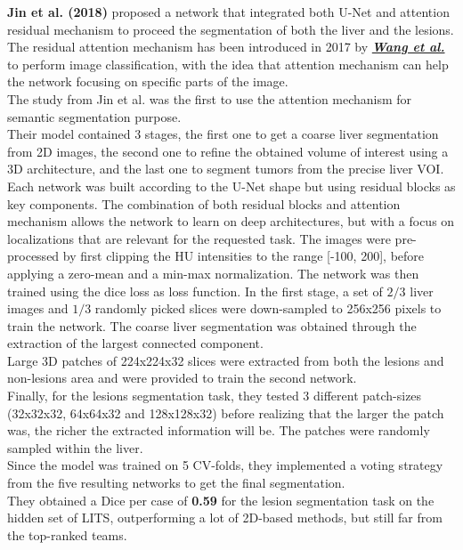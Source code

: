 \textbf{Jin et al. (2018)} proposed a network that integrated both U-Net
and attention residual mechanism to proceed the segmentation of both the
liver and the lesions.\\
The residual attention mechanism has been introduced in 2017 by
\href{https://arxiv.org/pdf/1704.06904.pdf}{\textbf{\emph{Wang et al.}}}
to perform image classification, with the idea that attention mechanism
can help the network focusing on specific parts of the image.\\
The study from Jin et al. was the first to use the attention mechanism
for semantic segmentation purpose.\\
Their model contained 3 stages, the first one to get a coarse liver
segmentation from 2D images, the second one to refine the obtained
volume of interest using a 3D architecture, and the last one to segment
tumors from the precise liver VOI.\\
Each network was built according to the U-Net shape but using residual
blocks as key components. The combination of both residual blocks and
attention mechanism allows the network to learn on deep architectures,
but with a focus on localizations that are relevant for the requested
task.
The images were pre-processed by first clipping the HU intensities to
the range {[}-100, 200{]}, before applying a zero-mean and a min-max
normalization. The network was then trained using the dice loss as loss
function.
In the first stage, a set of $2/3$ liver images and $1/3$ randomly picked slices
were down-sampled to 256x256 pixels to train the network. The coarse
liver segmentation was obtained through the extraction of the largest
connected component.\\
Large 3D patches of 224x224x32 slices were extracted from both the
lesions and non-lesions area and were provided to train the second
network.\\
Finally, for the lesions segmentation task, they tested 3 different
patch-sizes (32x32x32, 64x64x32 and 128x128x32) before realizing that
the larger the patch was, the richer the extracted information will be.
The patches were randomly sampled within the liver.\\
Since the model was trained on 5 CV-folds, they implemented a voting
strategy from the five resulting networks to get the final segmentation.\\
They obtained a Dice per case of \textbf{0.59} for the lesion
segmentation task on the hidden set of LITS, outperforming a lot of
2D-based methods, but still far from the top-ranked teams.
